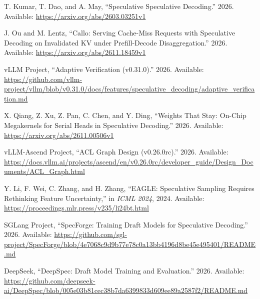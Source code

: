 \documentclass[11pt,a4paper,UTF8,fontset=none,scheme=plain,zihao=-4]{ctexart}
\newenvironment{CSLReferences}[2]{%
  \footnotesize
  \raggedright
  \setlength{\leftskip}{3em}%
  \setlength{\parindent}{-3em}%
  \setlength{\parskip}{0.1\baselineskip}%
  \sloppy
}{}
\newcommand{\CSLLeftMargin}[1]{\makebox[3em][l]{#1}}
\newcommand{\CSLRightInline}[1]{#1}
\begin{document}
\begin{CSLReferences}{0}{0}
\leavevmode{}%
\CSLLeftMargin{{[}51{]} }
\CSLRightInline{T. Kumar, T. Dao, and A. May, {``{Speculative
Speculative Decoding}.''} 2026. Available:
\url{https://arxiv.org/abs/2603.03251v1}}

\leavevmode{}%
\CSLLeftMargin{{[}52{]} }
\CSLRightInline{J. Ou and M. Lentz, {``{Callo: Serving Cache-Miss
Requests with Speculative Decoding on Invalidated KV under
Prefill-Decode Disaggregation}.''} 2026. Available:
\url{https://arxiv.org/abs/2611.18459v1}}

\leavevmode{}%
\CSLLeftMargin{{[}53{]} }
\CSLRightInline{vLLM Project, {``{Adaptive Verification (v0.31.0)}.''}
2026. Available:
\url{https://github.com/vllm-project/vllm/blob/v0.31.0/docs/features/speculative_decoding/adaptive_verification.md}}

\leavevmode{}%
\CSLLeftMargin{{[}54{]} }
\CSLRightInline{X. Qiang, Z. Xu, Z. Pan, C. Chen, and Y. Ding,
{``{Weights That Stay: On-Chip Megakernels for Serial Heads in
Speculative Decoding}.''} 2026. Available:
\url{https://arxiv.org/abs/2611.00506v1}}

\leavevmode{}%
\CSLLeftMargin{{[}55{]} }
\CSLRightInline{vLLM-Ascend Project, {``{ACL Graph Design
(v0.26.0rc)}.''} 2026. Available:
\url{https://docs.vllm.ai/projects/ascend/en/v0.26.0rc/developer_guide/Design_Documents/ACL_Graph.html}}

\leavevmode{}%
\CSLLeftMargin{{[}56{]} }
\CSLRightInline{Y. Li, F. Wei, C. Zhang, and H. Zhang, {``{EAGLE:
Speculative Sampling Requires Rethinking Feature Uncertainty},''} in
\emph{ICML 2024}, 2024. Available:
\url{https://proceedings.mlr.press/v235/li24bt.html}}

\leavevmode{}%
\CSLLeftMargin{{[}57{]} }
\CSLRightInline{SGLang Project, {``{SpecForge: Training Draft Models for
Speculative Decoding}.''} 2026. Available:
\url{https://github.com/sgl-project/SpecForge/blob/4e7068c9d9b77e78c0a13bb4196d8be45e495401/README.md}}

\leavevmode{}%
\CSLLeftMargin{{[}58{]} }
\CSLRightInline{DeepSeek, {``{DeepSpec: Draft Model Training and
Evaluation}.''} 2026. Available:
\url{https://github.com/deepseek-ai/DeepSpec/blob/005e03b81cec38b7da6399833d609ee89a2587f2/README.md}}


\end{CSLReferences}
\end{document}
